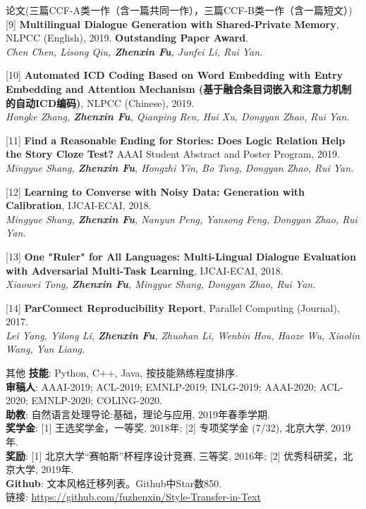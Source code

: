 \documentclass{resume} %
\begin{document}
\begin{rSection}{论文(三篇CCF-A类一作（含一篇共同一作），三篇CCF-B类一作（含一篇短文）)}
    [9] \textbf{Multilingual Dialogue Generation with Shared-Private Memory}, NLPCC (English), 2019. \textbf{Outstanding Paper Award}. \\
    {\it Chen Chen, Lisong Qiu, \textbf{Zhenxin Fu}, Junfei Li, Rui Yan. }

    [10] \textbf{Automated ICD Coding Based on Word Embedding with Entry Embedding and Attention Mechanism (基于融合条目词嵌入和注意力机制的自动ICD编码)}, NLPCC (Chinese), 2019. \\
    {\it Hongke Zhang, \textbf{Zhenxin Fu}, Qianping Ren, Hui Xu, Dongyan Zhao, Rui Yan.}

    [11] \textbf{Find a Reasonable Ending for Stories: Does Logic Relation Help the Story Cloze Test?} AAAI Student Abstract and Poster Program, 2019. \\
    {\it Mingyue Shang, \textbf{Zhenxin Fu}, Hongzhi Yin, Bo Tang, Dongyan Zhao, Rui Yan.}

    [12] \textbf{Learning to Converse with Noisy Data: Generation with Calibration}, IJCAI-ECAI, 2018. \\
    {\it Mingyue Shang, \textbf{Zhenxin Fu}, Nanyun Peng, Yansong Feng, Dongyan Zhao, Rui Yan.} 

    [13] \textbf{One "Ruler" for All Languages: Multi-Lingual Dialogue Evaluation with Adversarial Multi-Task Learning}, IJCAI-ECAI, 2018. \\
    {\it Xiaowei Tong, \textbf{Zhenxin Fu}, Mingyue Shang, Dongyan Zhao, Rui Yan.}

    [14] \textbf{ParConnect Reproducibility Report}, Parallel Computing (Journal), 2017.\\
    {\it Lei Yang, Yilong Li, \textbf{Zhenxin Fu}, Zhuohan Li, Wenbin Hou, Haoze Wu, Xiaolin Wang, Yun Liang.}
\end{rSection}

\begin{rSection}{其他}
    \textbf{技能}: Python, C++, Java, 按技能熟练程度排序. \\
    \textbf{审稿人}: AAAI-2019; ACL-2019; EMNLP-2019; INLG-2019; AAAI-2020; ACL-2020; EMNLP-2020; COLING-2020. \\
    \textbf{助教}: 自然语言处理导论:基础，理论与应用, 2019年春季学期. \\
    \textbf{奖学金}: [1] 王选奖学金，一等奖, 2018年; [2] 专项奖学金 (7/32), 北京大学, 2019年. \\
    \textbf{奖励}: [1] 北京大学``赛帕斯''杯程序设计竞赛, 三等奖, 2016年; [2] 优秀科研奖，北京大学, 2019年. \\
    \textbf{Github}: 文本风格迁移列表。Github中Star数850. \\链接: \url{https://github.com/fuzhenxin/Style-Transfer-in-Text}
\end{rSection}
\end{document}

